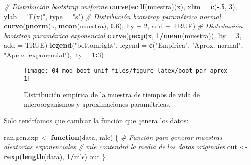 \documentclass[
]{book}
\newenvironment{Shaded}{\begin{snugshade}}{\end{snugshade}}
\newcommand{\CommentTok}[1]{\textcolor[rgb]{0.56,0.35,0.01}{\textit{#1}}}
\newcommand{\ControlFlowTok}[1]{\textcolor[rgb]{0.13,0.29,0.53}{\textbf{#1}}}
\newcommand{\DataTypeTok}[1]{\textcolor[rgb]{0.13,0.29,0.53}{#1}}
\newcommand{\DecValTok}[1]{\textcolor[rgb]{0.00,0.00,0.81}{#1}}
\newcommand{\FloatTok}[1]{\textcolor[rgb]{0.00,0.00,0.81}{#1}}
\newcommand{\KeywordTok}[1]{\textcolor[rgb]{0.13,0.29,0.53}{\textbf{#1}}}
\newcommand{\NormalTok}[1]{#1}
\newcommand{\OperatorTok}[1]{\textcolor[rgb]{0.81,0.36,0.00}{\textbf{#1}}}
\newcommand{\OtherTok}[1]{\textcolor[rgb]{0.56,0.35,0.01}{#1}}
\newcommand{\StringTok}[1]{\textcolor[rgb]{0.31,0.60,0.02}{#1}}
\theoremstyle{definition}
\theoremstyle{definition}
\theoremstyle{definition}
\theoremstyle{remark}
\begin{document}
\begin{Shaded}
\begin{Highlighting}[]
\CommentTok{# Distribución bootstrap uniforme}
\KeywordTok{curve}\NormalTok{(}\KeywordTok{ecdf}\NormalTok{(muestra)(x), }\DataTypeTok{xlim =} \KeywordTok{c}\NormalTok{(}\OperatorTok{-}\NormalTok{.}\DecValTok{5}\NormalTok{, }\DecValTok{3}\NormalTok{), }\DataTypeTok{ylab =} \StringTok{"F(x)"}\NormalTok{, }\DataTypeTok{type =} \StringTok{"s"}\NormalTok{)}
\CommentTok{# Distribución bootstrap paramétrico normal}
\KeywordTok{curve}\NormalTok{(}\KeywordTok{pnorm}\NormalTok{(x, }\KeywordTok{mean}\NormalTok{(muestra), }\FloatTok{0.6}\NormalTok{), }\DataTypeTok{lty =} \DecValTok{2}\NormalTok{, }\DataTypeTok{add =} \OtherTok{TRUE}\NormalTok{)}
\CommentTok{# Distribución bootstrap paramétrico exponencial}
\KeywordTok{curve}\NormalTok{(}\KeywordTok{pexp}\NormalTok{(x, }\DecValTok{1}\OperatorTok{/}\KeywordTok{mean}\NormalTok{(muestra)), }\DataTypeTok{lty =} \DecValTok{3}\NormalTok{, }\DataTypeTok{add =} \OtherTok{TRUE}\NormalTok{)}
\KeywordTok{legend}\NormalTok{(}\StringTok{"bottomright"}\NormalTok{, }\DataTypeTok{legend =} \KeywordTok{c}\NormalTok{(}\StringTok{"Empírica"}\NormalTok{, }\StringTok{"Aprox. normal"}\NormalTok{, }\StringTok{"Aprox. exponencial"}\NormalTok{), }\DataTypeTok{lty =} \DecValTok{1}\OperatorTok{:}\DecValTok{3}\NormalTok{)}
\end{Highlighting}
\end{Shaded}

\begin{figure}[!htb]

{\centering \texttt{[image: 04-mod\_boot\_unif\_files/figure-latex/boot-par-aprox-1]} 

}

\caption{Distribución empírica de la muestra de tiempos de vida de microorganismos y aproximaciones paramétricas.}\label{fig:boot-par-aprox}
\end{figure}

Solo tendríamos que cambiar la función que genera los datos:

\begin{Shaded}
\begin{Highlighting}[]
\NormalTok{ran.gen.exp <-}\StringTok{ }\ControlFlowTok{function}\NormalTok{(data, mle) \{}
    \CommentTok{# Función para generar muestras aleatorias exponenciales}
    \CommentTok{# mle contendrá la media de los datos originales}
\NormalTok{    out <-}\StringTok{ }\KeywordTok{rexp}\NormalTok{(}\KeywordTok{length}\NormalTok{(data), }\DecValTok{1}\OperatorTok{/}\NormalTok{mle)}
\NormalTok{    out}
\NormalTok{\}}
\end{Highlighting}
\end{Shaded}
\end{document}
